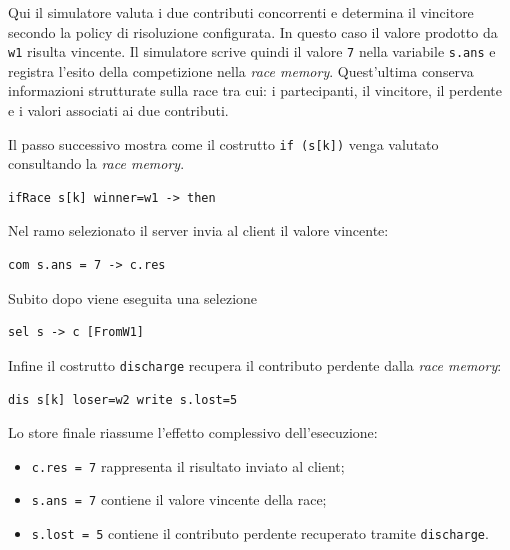 Qui il simulatore valuta i due contributi concorrenti e determina il vincitore secondo la policy di risoluzione configurata. In questo caso il valore prodotto da \texttt{w1} risulta vincente. Il simulatore scrive quindi il valore \texttt{7} nella variabile \texttt{s.ans} e registra l’esito della competizione nella \textit{race memory}. Quest’ultima conserva informazioni strutturate sulla race tra cui: i partecipanti, il vincitore, il perdente e i valori associati ai due contributi.

Il passo successivo mostra come il costrutto \texttt{if (s[k])} venga valutato consultando la \textit{race memory}. 

\begin{tcolorbox}[colback=black!2,colframe=black!35,boxrule=0.4pt]
\begin{verbatim}
ifRace s[k] winner=w1 -> then
\end{verbatim}
\end{tcolorbox}
 
Nel ramo selezionato il server invia al client il valore vincente:

\begin{tcolorbox}[colback=black!2,colframe=black!35,boxrule=0.4pt]
\begin{verbatim}
com s.ans = 7 -> c.res
\end{verbatim}
\end{tcolorbox}

Subito dopo viene eseguita una selezione

\begin{tcolorbox}[colback=black!2,colframe=black!35,boxrule=0.4pt]
\begin{verbatim}
sel s -> c [FromW1]
\end{verbatim}
\end{tcolorbox}

Infine il costrutto \texttt{discharge} recupera il contributo perdente dalla \textit{race memory}:

\begin{tcolorbox}[colback=black!2,colframe=black!35,boxrule=0.4pt]
\begin{verbatim}
dis s[k] loser=w2 write s.lost=5
\end{verbatim}
\end{tcolorbox}

Lo store finale riassume l’effetto complessivo dell’esecuzione:

\begin{itemize}
\item \texttt{c.res = 7} rappresenta il risultato inviato al client;
\item \texttt{s.ans = 7} contiene il valore vincente della race;
\item \texttt{s.lost = 5} contiene il contributo perdente recuperato tramite \texttt{discharge}.
\end{itemize}

